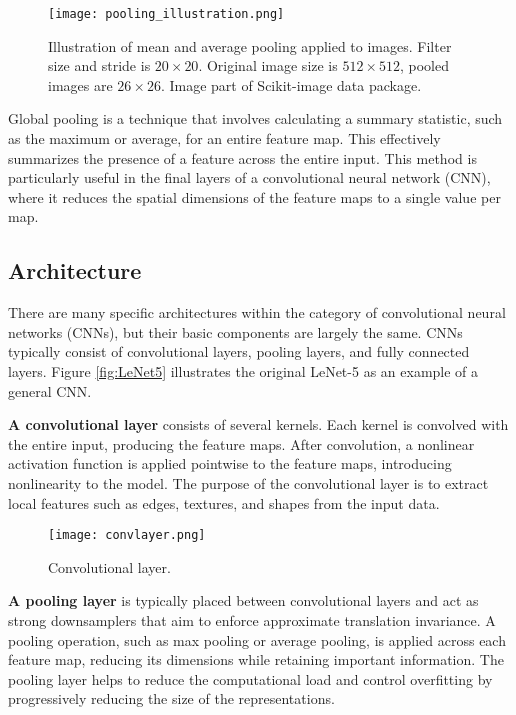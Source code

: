 \documentclass[../../thesis.tex]{subfiles}
\begin{document}
\begin{figure}[h]
    \centering
    \texttt{[image: pooling\_illustration.png]}
    \caption{Illustration of mean and average pooling applied to images. Filter size and stride is $20\times 20$. Original image size is $512\times 512$, pooled images are $26\times26$. Image part of Scikit-image data package.}
    \label{fig:mean_max_pool}
\end{figure}

Global pooling is a technique that involves calculating a summary statistic, such as the maximum or average, for an entire feature map. This effectively summarizes the presence of a feature across the entire input. This method is particularly useful in the final layers of a convolutional neural network (CNN), where it reduces the spatial dimensions of the feature maps to a single value per map.

\subsection{Architecture}
There are many specific architectures within the category of convolutional neural networks (CNNs), but their basic components are largely the same. CNNs typically consist of convolutional layers, pooling layers, and fully connected layers. Figure \ref{fig:LeNet5} illustrates the original LeNet-5 \cite{LeCun1989ConvNet} as an example of a general CNN.\newline

\textbf{A convolutional layer} consists of several kernels. Each kernel is convolved with the entire input, producing the feature maps. After convolution, a nonlinear activation function is applied pointwise to the feature maps, introducing nonlinearity to the model. The purpose of the convolutional layer is to extract local features such as edges, textures, and shapes from the input data.
\begin{figure}[h]
    \centering
    \texttt{[image: convlayer.png]}
    \caption{Convolutional layer.}
    \label{fig:convlayer}
\end{figure}

\textbf{A pooling layer} is typically placed between convolutional layers and act as strong downsamplers that aim to enforce approximate translation invariance. A pooling operation, such as max pooling or average pooling, is applied across each feature map, reducing its dimensions while retaining important information. The pooling layer helps to reduce the computational load and control overfitting by progressively reducing the size of the representations.\newline
\end{document}
